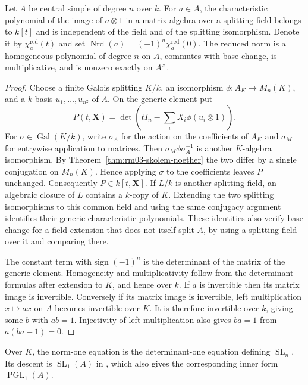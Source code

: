 \begin{proposition}
\label{prop:rm03-reduced-norm}
Let \(A\) be central simple of degree \(n\) over \(k\).
For \(a\in A\), the characteristic polynomial of the image of
\(a\otimes 1\) in a matrix algebra over a splitting field belongs
to \(k[t]\) and is independent of the field and of the splitting
isomorphism. Denote it by \(\chi_a^{\mathrm{red}}(t)\) and set
\(\operatorname{Nrd}(a)=(-1)^n\chi_a^{\mathrm{red}}(0)\).
The reduced norm is a homogeneous polynomial of degree \(n\)
on \(A\), commutes with base change, is multiplicative, and
is nonzero exactly on \(A^\times\).
\end{proposition}
\begin{proof}
Choose a finite Galois splitting \(K/k\), an isomorphism
\(\phi:A_K\to M_n(K)\), and a \(k\)-basis \(u_1,\ldots,u_{n^2}\)
of \(A\). On the generic element put
\[
 P(t,\mathbf X)=
 \det\left(tI_n-\sum_i X_i\phi(u_i\otimes 1)\right).
\]
For \(\sigma\in\operatorname{Gal}(K/k)\), write \(\sigma_A\)
for the action on the coefficients of \(A_K\) and \(\sigma_M\)
for entrywise application to matrices. Then
\(\sigma_M\phi\sigma_A^{-1}\) is another \(K\)-algebra
isomorphism. By Theorem~\ref{thm:rm03-skolem-noether} the
two differ by a single conjugation on \(M_n(K)\). Hence
applying \(\sigma\) to the coefficients leaves \(P\) unchanged.
Consequently \(P\in k[t,\mathbf X]\). If \(L/k\) is another
splitting field, an algebraic closure of \(L\) contains a
\(k\)-copy of \(K\). Extending the two splitting isomorphisms
to this common field and using the same conjugacy argument
identifies their generic characteristic polynomials. These
identities also verify base change for a field extension
that does not itself split \(A\), by using a splitting field
over it and comparing there.

The constant term with sign \((-1)^n\) is the determinant
of the matrix of the generic element. Homogeneity and
multiplicativity follow from the determinant formulas after
extension to \(K\), and hence over \(k\). If \(a\) is invertible
then its matrix image is invertible. Conversely if its
matrix image is invertible, left multiplication \(x\mapsto ax\)
on \(A\) becomes invertible over \(K\). It is therefore
invertible over \(k\), giving some \(b\) with \(ab=1\).
Injectivity of left multiplication also gives \(ba=1\)
from \(a(ba-1)=0\).
\end{proof}

Over \(K\), the norm-one equation is the determinant-one
equation defining \(\operatorname{SL}_n\). Its descent is
\(\operatorname{SL}_1(A)\) in \cite[Result F05]{lag}, which
also gives the corresponding inner form \(\operatorname{PGL}_1(A)\).

